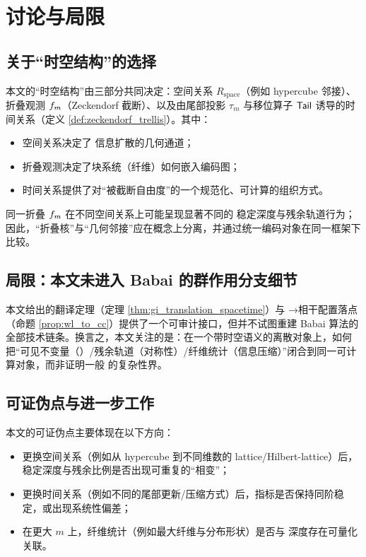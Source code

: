 \section{讨论与局限}

\subsection{关于“时空结构”的选择}

本文的“时空结构”由三部分共同决定：空间关系 $R_{\mathrm{space}}$（例如 hypercube 邻接）、折叠观测 $f_m$（Zeckendorf 截断）、以及由尾部投影 $\tau_m$ 与移位算子 $\mathsf{Tail}$ 诱导的时间关系（定义 \ref{def:zeckendorf_trellis}）。其中：
\begin{itemize}
  \item 空间关系决定了 \WL{} 信息扩散的几何通道；
  \item 折叠观测决定了块系统（纤维）如何嵌入编码图；
  \item 时间关系提供了对“被截断自由度”的一个规范化、可计算的组织方式。
\end{itemize}
同一折叠 $f_m$ 在不同空间关系上可能呈现显著不同的 \WL{} 稳定深度与残余轨道行为；因此，“折叠核”与“几何邻接”应在概念上分离，并通过统一编码对象在同一框架下比较。

\subsection{局限：本文未进入 Babai 的群作用分支细节}

本文给出的翻译定理（定理 \ref{thm:gi_translation_spacetime}）与 \WL{}→相干配置落点（命题 \ref{prop:wl_to_cc}）提供了一个可审计接口，但并不试图重建 Babai 算法的全部技术链条。换言之，本文关注的是：在一个带时空语义的离散对象上，如何把“可见不变量（\WL{}）/残余轨道（对称性）/纤维统计（信息压缩）”闭合到同一可计算对象，而非证明一般 \GI{} 的复杂性界。

\subsection{可证伪点与进一步工作}

本文的可证伪点主要体现在以下方向：
\begin{itemize}
  \item 更换空间关系（例如从 hypercube 到不同维数的 lattice/Hilbert-lattice）后，\WL{} 稳定深度与残余比例是否出现可重复的“相变”；
  \item 更换时间关系（例如不同的尾部更新/压缩方式）后，指标是否保持同阶稳定，或出现系统性偏差；
  \item 在更大 $m$ 上，纤维统计（例如最大纤维与分布形状）是否与 \WL{} 深度存在可量化关联。
\end{itemize}

